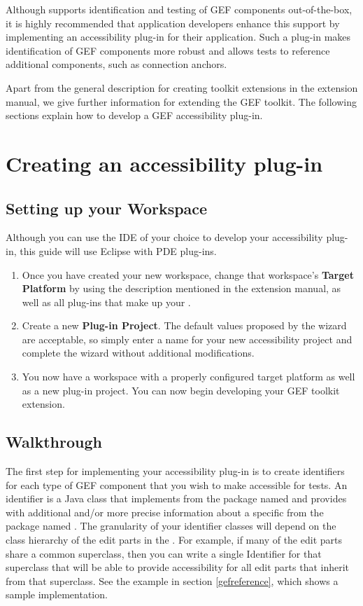 Although \app{} supports identification and testing of GEF components
out-of-the-box, it is highly recommended that application developers enhance
this support by implementing an accessibility plug-in for their application. Such a
plug-in makes identification of GEF components more robust and allows \app{}
tests to reference additional components, such as connection anchors.

Apart from the general description for creating toolkit extensions in the
extension manual, we give further information for extending the GEF toolkit. The
following sections explain how to develop a GEF accessibility plug-in.

\section{Creating an accessibility plug-in}

\subsection{Setting up your Workspace}
Although you can use the IDE of your choice to develop your accessibility
plug-in, this guide will use Eclipse with PDE plug-ins.

\begin{enumerate}
\item Once you have created your new workspace, change that workspace's
\textbf{Target Platform} by using the description mentioned in the extension
manual, as well as all plug-ins that make up your \gdaut{}.

\item Create a new \textbf{Plug-in Project}. The default values proposed by the
wizard are acceptable, so simply enter a name for your new accessibility project
and complete the wizard without additional modifications.

\item You now have a workspace with a properly configured target platform as
well as a new plug-in project. You can now begin developing your GEF
toolkit extension.
\end{enumerate}

\subsection{Walkthrough}
The first step for implementing your accessibility plug-in is to create
identifiers for each type of GEF component that you wish to make accessible for
\app{} tests. An identifier is a Java class that implements
 from the package named
 and provides \app{} with
additional and/or more precise information about a specific 
from the package named . The granularity of your
identifier classes will depend on the class hierarchy of the edit parts in the
\gdaut{}. For example, if many of the edit parts share a common superclass, then
you can write a single Identifier for that superclass that will be able to
provide accessibility for all edit parts that inherit from that superclass. See
the example in section \ref{gefreference}, which shows a sample implementation.

